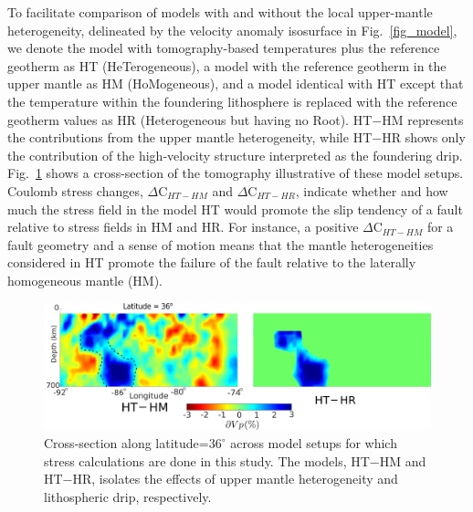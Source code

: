 \documentclass[draft,linenumbers]{agujournal2018}
\begin{document}
To facilitate comparison of models with and without the local upper-mantle heterogeneity, delineated by the velocity anomaly isosurface in Fig.~\ref{fig_model}, we denote the model with tomography-based temperatures plus the reference geotherm as HT (HeTerogeneous), a model with the reference geotherm in the upper mantle as HM (HoMogeneous), and a model identical with HT except that the temperature within the foundering lithosphere is replaced with the reference geotherm values as HR (Heterogeneous but having no Root). HT$-$HM represents the contributions from the upper mantle heterogeneity, while HT$-$HR shows only the contribution of the high-velocity structure interpreted as the foundering drip. Fig.~\ref{model_differences} shows a cross-section of the tomography illustrative of these model setups.  Coulomb stress changes, $\Delta$C$_{HT-HM}$ and $\Delta$C$_{HT-HR}$, indicate whether and how much the stress field in the model HT would promote the slip tendency of a fault relative to stress fields in HM and HR. For instance, a positive $\Delta$C$_{HT-HM}$ for a fault geometry and a sense of motion means that the mantle heterogeneities considered in HT promote the failure of the fault relative to the laterally homogeneous mantle (HM). 

\begin{figure}[h!]
    \centering
    \includegraphics[width=\linewidth]{figures/model_differences.png}
    \caption{Cross-section along latitude=$36^\circ$ across model setups for which stress calculations are done in this study. The models, HT$-$HM and HT$-$HR, isolates the effects of upper mantle heterogeneity and lithospheric drip, respectively.}
    \label{model_differences}
\end{figure}
\end{document}
